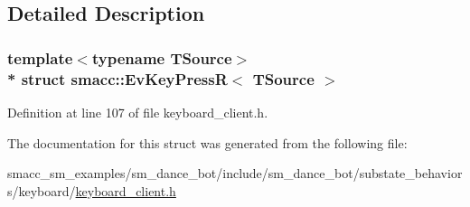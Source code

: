 \subsection{Detailed Description}
\subsubsection*{template$<$typename T\+Source$>$\\*
struct smacc\+::\+Ev\+Key\+Press\+R$<$ T\+Source $>$}



Definition at line 107 of file keyboard\+\_\+client.\+h.



The documentation for this struct was generated from the following file\+:\begin{DoxyCompactItemize}
\item 
smacc\+\_\+sm\+\_\+examples/sm\+\_\+dance\+\_\+bot/include/sm\+\_\+dance\+\_\+bot/substate\+\_\+behaviors/keyboard/\hyperlink{keyboard__client_8h}{keyboard\+\_\+client.\+h}\end{DoxyCompactItemize}
